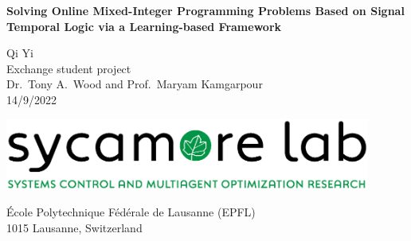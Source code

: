\documentclass[a4paper]{report}
\author{Student name}
\begin{document}
\begin{titlepage}
    \begin{center}
        \vspace*{1cm}

        \huge
        \textbf{Solving Online Mixed-Integer Programming Problems Based on Signal Temporal Logic via a Learning-based Framework}
        \vspace{0.5cm}

        \vspace{1.5cm}
        \Large
        {\color{sycamoregreen}Qi Yi} \\
        \vspace{2cm}
        \large
        Exchange student project \\
        \vspace{2cm}
        Dr.\ Tony A.\ Wood and Prof.\ Maryam Kamgarpour
        \\
        \vspace{5em}
        14/9/2022

        \vfill
        \includegraphics[width=0.9\textwidth]{Sycamore_withtext_DIGITAL_RGB-01.eps}
        \vspace{0.5cm}

        École Polytechnique Fédérale de Lausanne (EPFL)\\
        1015 Lausanne, Switzerland

    \end{center}
\end{titlepage}
\end{document}
